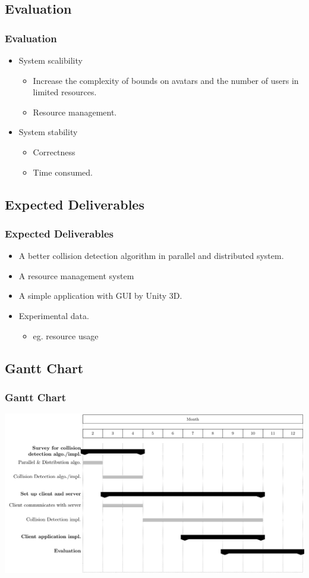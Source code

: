 \documentclass{beamer}
\begin{document}
\subsection{Evaluation}
	\begin{frame}
	\frametitle{Evaluation}
	\begin{itemize}
		\item System scalibility
			\begin{itemize}
				\item Increase the complexity of bounds on avatars and the number of users in limited resources.
				\item Resource management.
			\end{itemize}
		\item System stability
			\begin{itemize}
				\item Correctness
				\item Time consumed.
			\end{itemize}
	\end{itemize}
	\end{frame}

\subsection{Expected Deliverables}
	\begin{frame}
	\frametitle{Expected Deliverables}
	\begin{itemize}
		\item A better collision detection algorithm in parallel and distributed system.
		\item A resource management system
		\item A simple application with GUI by Unity 3D.
		\item Experimental data.
		\begin{itemize}
			\item eg. resource usage
		\end{itemize}
	\end{itemize}
	\end{frame}

\subsection{Gantt Chart}
	\begin{frame}
	\frametitle{Gantt Chart}
	\includegraphics[scale=0.5]{figure/GanttChart.pdf}	
	\end{frame}
\end{document}
